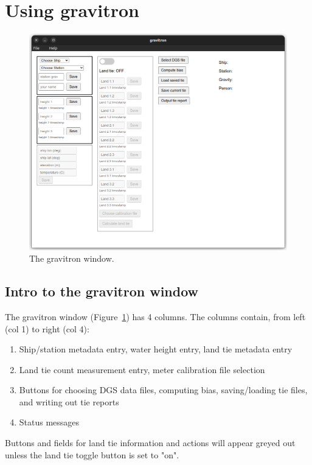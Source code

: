 \documentclass{pfpe-manual}
\begin{document}
\section{Using gravitron}

\begin{figure}[ht!]
\centering
\includegraphics[width=\textwidth]{figs/gravitron_window.png}
\caption{The gravitron window.}
\label{fig:window}
\end{figure}

\subsection{Intro to the gravitron window}

The gravitron window (Figure~\ref{fig:window}) has 4 columns. The columns contain, from left (col 1) to right (col 4):
\begin{enumerate}
\item Ship/station metadata entry, water height entry, land tie metadata entry
\item Land tie count measurement entry, meter calibration file selection
\item Buttons for choosing DGS data files, computing bias, saving/loading tie files, and writing out tie reports
\item Status messages
\end{enumerate}

\noindent
Buttons and fields for land tie information and actions will appear greyed out unless the land tie toggle button is set to "on".
\end{document}
